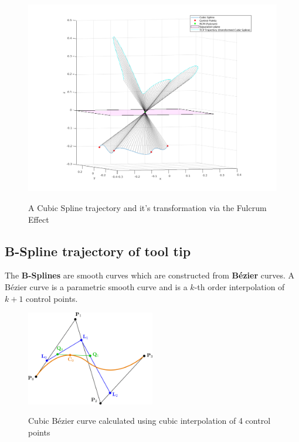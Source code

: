 \begin{center}
\begin{figure}[!htb]
\centering
\includegraphics[width=\textwidth]{images/rcm_trajectories/rcm_cubic_traj.png}\\
\caption{A Cubic Spline trajectory and it's transformation via the Fulcrum Effect}
\end{figure}
\end{center}


\subsection{B-Spline trajectory of tool tip}

The \textbf{B-Splines} are smooth curves which are constructed from \textbf{B\'ezier} curves. A B\'ezier curve is a parametric smooth curve and is a $k$-th order interpolation of $k+1$ control points.

\begin{center}
\begin{figure}[!htb]
\centering
\includegraphics[width=0.5\textwidth]{images/bezier-curve.png}\\
\caption{Cubic B\'ezier curve calculated using cubic interpolation of 4 control points} 
\end{figure}
\end{center}


